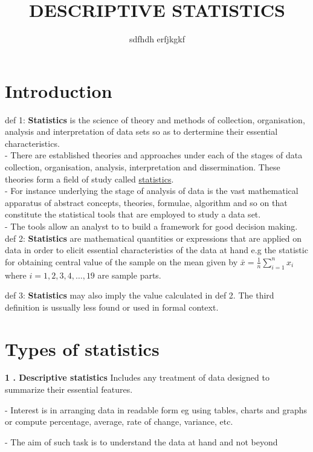 \documentclass[12pt,a4paper]{article}
\title{DESCRIPTIVE STATISTICS}
\author{sdfhdh erfjkgkf}
\begin{document}
%
\maketitle
\tableofcontents
\section{Introduction}
\setlength{\parskip}{0.5em} %
def 1: \textbf{Statistics} is the science of theory and methods of collection, organisation, analysis and interpretation of data sets so as to dertermine their essential characteristics. \\ - There are established theories and approaches under each of the stages of data collection, organisation, analysis, interpretation and dissermination. These theories form a field of study called \underline{statistics}. \\ - For instance underlying the stage of analysis of data is the vast mathematical apparatus of abstract concepts, theories, formulae, algorithm and so on that constitute the statistical tools that are employed to study a data set. \\ - The tools allow an analyst to to build a framework for good decision making.
\newline
def 2: \textbf{Statistics} are mathematical quantities or expressions that are applied on data in order to elicit essential characteristics of the data at hand e.g the statistic for obtaining central value of the sample on the mean given by $\bar{x} = \frac{1}{n}\sum_{i = 1}^{n} x_i$ where $i = 1,2,3,4, \dots,19$ are sample parts. \

def 3: \textbf{Statistics} may also imply the value calculated in def 2.
The third definition is ussually less found or used in formal context.

\section{Types of statistics}
\textbf{1 . Descriptive statistics} Includes any treatment of data designed to summarize their essential features.

- Interest is in arranging data in readable form eg using tables, charts and graphs or compute percentage, average, rate of change, variance, etc.

- The aim of such task is to understand the data at hand and not beyond
\end{document}
